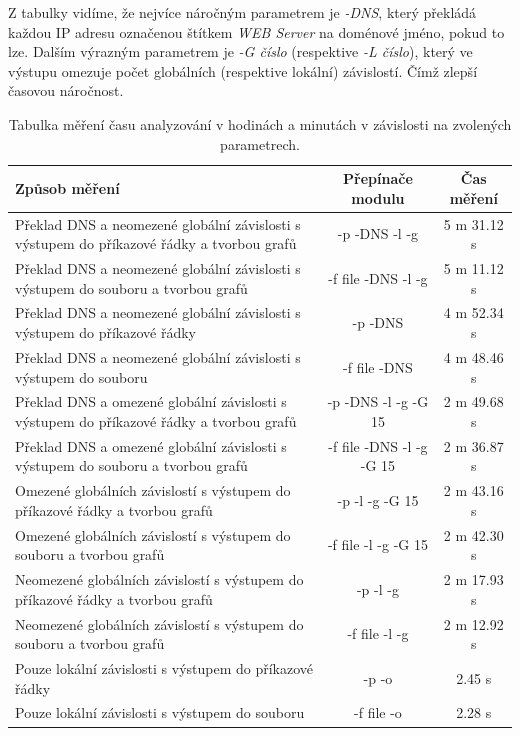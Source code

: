 \documentclass[thesis=B,czech,hidelinks]{FITthesis}[2019/03/21]
\begin{document}
    Z tabulky vidíme, že nejvíce náročným parametrem je \emph{-DNS}, který překládá každou IP adresu označenou štítkem \emph{WEB Server} na doménové jméno, pokud to lze. Dalším výrazným parametrem je \emph{-G číslo} (respektive \emph{-L číslo}), který ve výstupu omezuje počet globálních (respektive lokální) závislostí. Čímž zlepší časovou náročnost.
    \newpage
    \begin{table}[h]\centering
 	    \caption[Tabulka časových měření: DeviceAnalyzer skript]{Tabulka měření času analyzování v hodinách a minutách v závislosti na zvolených parametrech.}\label{TabMereniD}
 	    \begin{tabular}{|>{\centering}m{}|c|c|}\hline
 		\textbf{Způsob měření}		                    & \textbf{Přepínače modulu} & \textbf{Čas měření} \tabularnewline \hline \hline
 		Překlad DNS a neomezené globální závislosti	s výstupem do příkazové řádky a tvorbou grafů	            & 	-p -DNS -l -g	& 5 m 31.12 s	\tabularnewline \hline
 		Překlad DNS a neomezené globální závislosti	s výstupem do souboru a tvorbou grafů		            & 	-f file -DNS -l -g	& 5 m 11.12 s	\tabularnewline \hline
 		Překlad DNS a neomezené globální závislosti	s výstupem do příkazové řádky		            & 	-p -DNS	& 4 m 52.34 s	\tabularnewline \hline
 		Překlad DNS a neomezené globální závislosti	s výstupem do souboru		            & 	-f file -DNS	& 4 m 48.46 s	\tabularnewline \hline
 		Překlad DNS a omezené globální závislosti	s výstupem do příkazové řádky a tvorbou grafů		            & 	-p -DNS -l -g -G 15	& 2 m 49.68 s	\tabularnewline \hline
 		Překlad DNS a omezené globální závislosti	s výstupem do souboru a tvorbou grafů	            & 	-f file -DNS -l -g -G 15	& 2 m 36.87 s	\tabularnewline \hline
 		Omezené globálních závislostí s výstupem do příkazové řádky a tvorbou grafů		            & 	-p -l -g -G 15	& 2 m 43.16 s	\tabularnewline \hline
 		Omezené globálních závislostí s výstupem do souboru a tvorbou grafů			            & 	-f file -l -g -G 15	& 2 m 42.30 s	\tabularnewline \hline
 		Neomezené globálních závislostí s výstupem do příkazové řádky a tvorbou grafů		            & 	-p -l -g	& 2 m 17.93 s	\tabularnewline \hline
 		Neomezené globálních závislostí s výstupem do souboru a tvorbou grafů		            & 	-f file -l -g	& 2 m 12.92 s	\tabularnewline \hline
 		Pouze lokální závislosti s výstupem do příkazové řádky		            & 	-p -o	& 2.45 s	\tabularnewline \hline
 		Pouze lokální závislosti s výstupem do souboru		            & 	-f file -o	& 2.28 s	\tabularnewline \hline
 		
 	    \end{tabular}
 	\end{table}
 	\newpage
    
\end{document}
